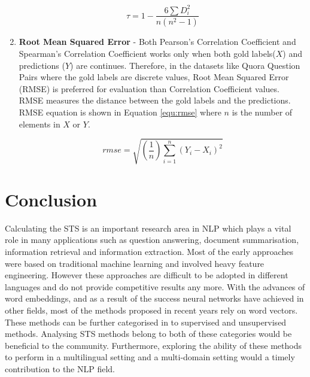 \begin{enumerate}
	
	\begin{equation}
	\label{equ:spearman}
	\tau = 1- {\frac {6 \sum D_i^2}{n(n^2 - 1)}}
	\end{equation}
	
	
	\item \textbf{Root Mean Squared Error} - Both Pearson's Correlation Coefficient and Spearman's Correlation Coefficient works only when both gold labels($X$) and predictions ($Y$) are continues. Therefore, in the datasets like Quora Question Pairs where the gold labels are discrete values, Root Mean Squared Error (RMSE) is preferred for evaluation than Correlation Coefficient values. RMSE measures the distance between the gold labels and the predictions. RMSE equation is shown in Equation \ref{equ:rmse} where $n$ is the number of elements in $X$ or $Y$. 
	
	\begin{equation}
	\label{equ:rmse}
	rmse = \sqrt{(\frac{1}{n})\sum_{i=1}^{n}(Y_{i} - X_{i})^{2}}
	\end{equation}
	
\end{enumerate}

\section{Conclusion}
Calculating the STS is an important research area in NLP which plays a vital role in many applications such as question answering, document summarisation, information retrieval and information extraction. Most of the early approaches were based on traditional machine learning and involved heavy feature engineering. However these approaches are difficult to be adopted in different languages and do not provide competitive results any more. With the advances of word embeddings, and as a result of the success neural networks have achieved in other fields, most of the methods proposed in recent years rely on word vectors. These methods can be further categorised in to supervised and unsupervised methods. Analysing STS methods belong to both of these categories would be beneficial to the community. Furthermore, exploring the ability of these methods to perform in a multilingual setting and a multi-domain setting would a timely contribution to the NLP field. 

